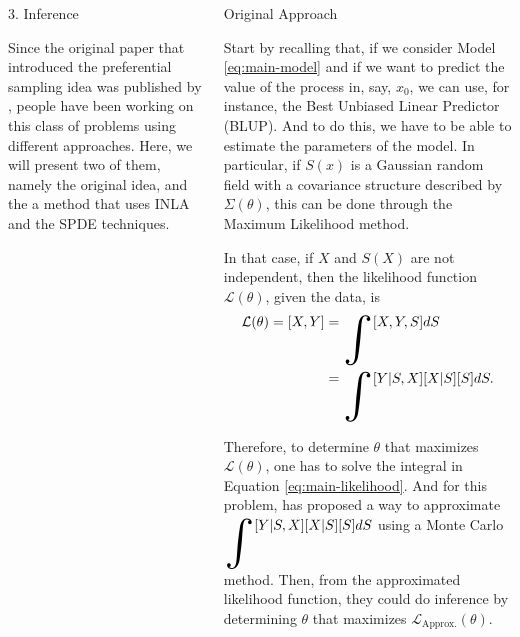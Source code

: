 \documentclass[12pt]{beamer}
\begin{document}
\begin{frame}[t]
\begin{columns}[t]
\begin{column}{0.30\textwidth}
				
			\begin{block}{\Large 3. Inference} \justifying \vspace{12pt}				
				
				Since the original paper that introduced the preferential sampling idea was published by \cite{diggle2010geostatistical}, people have been working on this class of problems using different approaches. Here, we will present two of them, namely the original idea, and the a method that uses INLA and the SPDE techniques. 
				
			\end{block}
			
			\end{column}
		
			\begin{column}{0.30\textwidth} \justifying %
			
			{\large \textcolor{title-fg}{Original Approach}} \vspace{18pt}
				
			Start by recalling that, if we consider Model \eqref{eq:main-model} and if we want to predict the value of the process in, say, $x_0$, we can use, for instance, the Best Unbiased Linear Predictor (BLUP). And to do this, we have to be able to estimate the parameters of the model. In particular, if $S(x)$ is a Gaussian random field with a covariance structure described by $\Sigma(\theta)$, this can be done through the Maximum Likelihood method.\vspace{18pt}
			
			In that case, if $X$ and $S(X)$ are not independent, then the likelihood function $\mathcal{L}(\theta)$, given the data, is
			\begin{align} \label{eq:main-likelihood}
				\mathcal{L}(\theta) = [X, Y] &= \displaystyle\raisebox{-18pt}{\scalebox{3.2}{\ensuremath{\int}}} [X, Y, S] dS \nonumber \\
															   &= \displaystyle\raisebox{-18pt}{\scalebox{3.2}{\ensuremath{\int}}} [Y|S, X][X|S][S]dS.
			\end{align}
		
			\vspace{6pt}
			Therefore, to determine $\theta$ that maximizes $\mathcal{L}(\theta)$, one has to solve the integral in Equation \eqref{eq:main-likelihood}. And for this problem, \cite{diggle2010geostatistical} has proposed a way to approximate $\displaystyle\raisebox{-18pt}{\scalebox{3.2}{\ensuremath{\int}}} [Y|S, X][X|S][S]dS$ using a Monte Carlo method. Then, from the approximated likelihood function, they could do inference by determining $\theta$ that maximizes $\mathcal{L}_{\text{Approx.}}(\theta)$.\vspace{18pt}\vspace{18pt}
			

\end{column}
\end{columns}
\end{frame}
\end{document}
